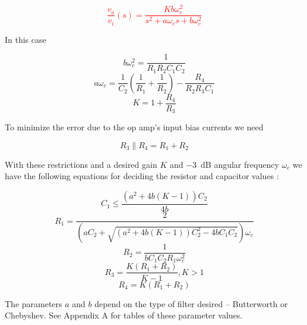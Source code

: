 \textcolor{red}{
\begin{equation}
\frac{v_{o}}{v_{i}}(s) = \frac{Kb\omega_{c}^{2}}{s^{2} + a\omega_{c}s + b\omega_{c}^{2}}
\label{eq:2ndorder_vcvs_LPfilter}
\end{equation}
}

In this case

\begin{equation}
b\omega_{c}^{2} = \frac{1}{R_{1}R_{2}C_{1}C_{2}}
\end{equation}
\begin{equation}
a\omega_{c} = \frac{1}{C_{2}}\left(\frac{1}{R_{1}} + \frac{1}{R_{2}}\right) - \frac{R_{4}}{R_{2}R_{3}C_{1}}
\end{equation}
\begin{equation}
K = 1 + \frac{R_{4}}{R_{3}}
\end{equation}

To minimize the error due to the op amp's input bias currents we need

\begin{equation}
R_3 \parallel R_4 = R_1 + R_2
\end{equation}

With these restrictions and a desired gain $K$ and \SI{-3}{\dB} angular frequency $\omega_{c}$ we have the following equations for deciding the resistor and capacitor values \autocite[118-119]{op-amp-circuits-johnson}:

\begin{equation}
C_1 \leq \frac{(a^2+4b(K-1))C_2}{4b}
\end{equation}
\begin{equation}
R_1 = \frac{2}{(aC_2+\sqrt{(a^2+4b(K-1))C_2^2 - 4b C_1 C_2})\omega_{c}}
\end{equation}
\begin{equation}
R_2 = \frac{1}{bC_1 C_2 R_1\omega_{c}^2}
\end{equation}
\begin{equation}
R_3 = \frac{K(R_1 + R_2)}{K-1}, K > 1
\end{equation}
\begin{equation}
R_4 = K(R_1 + R_2)
\end{equation}

The parameters $a$ and $b$ depend on the type of filter desired -- Butterworth or Chebyshev. See Appendix A for tables of these parameter values.

